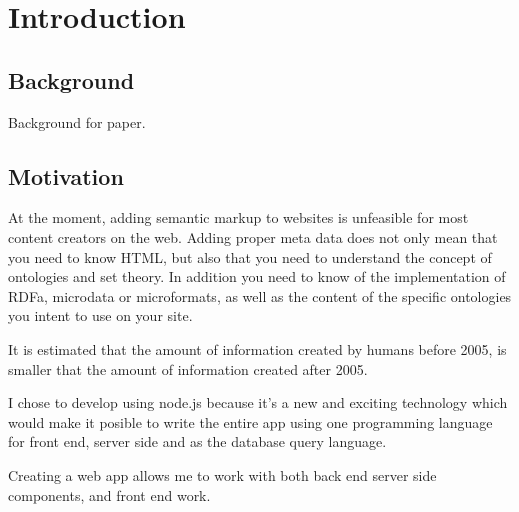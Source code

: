 
\chapter{Introduction} %

\label{Introduction} %



\section{Background}
Background for paper.


\section{Motivation}
At the moment, adding semantic markup to websites is unfeasible for most content creators on the web.
Adding proper meta data does not only mean that you need to know HTML, 
but also that you need to understand the concept of ontologies and set theory. 
In addition you need to know of the implementation of RDFa, microdata or microformats, 
as well as the content of the specific ontologies you intent to use on your site.


It is estimated that the amount of information created by humans before 2005, 
is smaller that the amount of information created after 2005.

I chose to develop using node.js because it's a new and exciting technology which would make it posible to write the entire app using one programming language for front end, server side and as the database query language.

Creating a web app allows me to work with both back end server side components, and front end work. 

